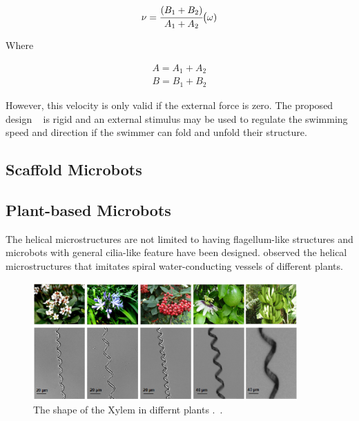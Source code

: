 \documentclass[a4paper,11pt]{article}
\begin{document}
\begin{sloppypar}
\begin{equation}
  \nu = {\cfrac{(B_1 + B_2)}{A_1+A_2}} \big( \omega)
\end{equation} 

Where

\begin{equation}
\begin{split}
  A = A_1+A_2 \\
 B= B_1+B_2
\end{split}
\end{equation} 

However, this velocity is only valid if the external force is zero. The proposed 
design ~\citep{tottori2013artificial} is rigid and an external stimulus may be used to regulate the swimming
 speed and direction if the swimmer can fold and unfold their structure. 


\subsection{Scaffold Microbots}


\subsection{Plant-based Microbots}

The helical microstructures are not limited to having flagellum-like structures and microbots with
general cilia-like feature have been designed. \citeauthor{gao2013bioinspired}
 observed the helical microstructures that imitates spiral water-conducting vessels of different plants. 

\begin{figure}
  \centering
    \includegraphics[width=0.9\textwidth]{plants}
  \caption{The shape of the Xylem in differnt plants .~\citep{mahoney2011velocity}.}
  \label{plants}
\end{figure}




\end{sloppypar}
\end{document}
